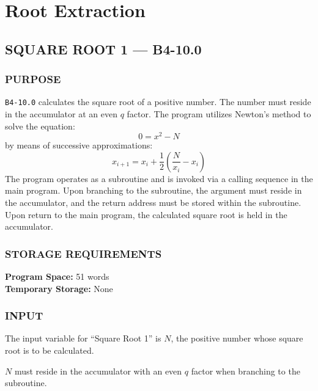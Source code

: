 \section{Root Extraction}
\subsection*{SQUARE ROOT 1 --- B4-10.0}
\label{sec:square_root_1}

\subsubsection*{PURPOSE}
\texttt{B4-10.0} calculates the square root of a positive number. The number must reside in the accumulator at an even $q$ factor. The program utilizes Newton's method to solve the equation:
\begin{equation}
    0 = x^2 - N
\end{equation}
by means of successive approximations:
\begin{equation}
    x_{i+1} = x_i + \frac{1}{2} \left( \frac{N}{x_i} - x_i \right)
\end{equation}
The program operates as a subroutine and is invoked via a calling sequence in the main program. Upon branching to the subroutine, the argument must reside in the accumulator, and the return address must be stored within the subroutine. Upon return to the main program, the calculated square root is held in the accumulator.

\subsubsection*{STORAGE REQUIREMENTS}
\textbf{Program Space:} 51 words \\
\textbf{Temporary Storage:} None

\subsubsection*{INPUT}
The input variable for ``Square Root 1'' is $N$, the positive number whose square root is to be calculated.

$N$ must reside in the accumulator with an even $q$ factor when branching to the subroutine.

